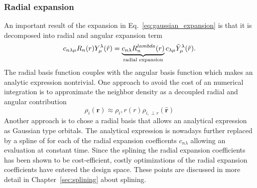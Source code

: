 \subsubsection{Radial expansion}
An important result of the expansion in Eq.~\ref{eq:gaussian_expansion} is that it is decomposed into radial and angular expansion term
\begin{equation}
  \label{eq:radial_expansion}
  c_{n\lambda\mu} R_n(r)Y^\lambda_\mu(\hat{r}) = \underbrace{c_{n\lambda}R^{lambda}_n(r)}_{\textrm{radial expansion}} c_{\lambda\mu}\tilde{Y}^\lambda_\mu(\hat{r}).\\
\end{equation}
The radial basis function couples with the angular basis function which makes an analytic expression nontrivial.
One approach to avoid the cost of an numerical integration is to approximate the neighbor density as a decoupled radial and angular contribution\cite{caro2019optimizing} 
\begin{equation}
  \rho_i(\mathbf{r}) \approx \rho_i,r(r)\rho_{i,\perp r}(\hat{\mathbf{r}})
\end{equation}
Another approach is to chose a radial basis that allows an analytical expression as Gaussian type orbitals\cite{musil2021efficient}.
The analytical expression is nowadays further replaced by a spline of for each of the radial expansion coefficents $c_{n\lambda}$ allowing an evaluation at constant time.
Since the splining the radial expansion coefficients has been shown to be cost-efficient\cite{musil2021efficient}, costly optimizations of the radial expansion coefficients have entered the design space\cite{goscinski2021optimal,bigi2022smooth,lopanitsyna2023modeling}.
These points are discussed in more detail in Chapter~\ref{sec:splining} about splining.




